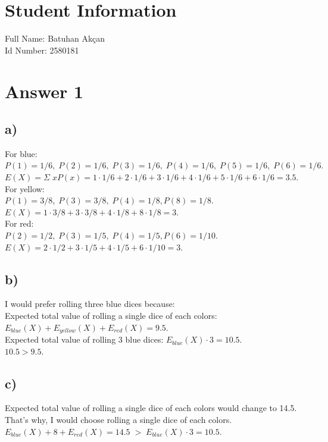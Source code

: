 \documentclass[12pt]{article}
\begin{document}
\section*{Student Information}
Full Name: Batuhan Akçan\\
Id Number: 2580181
\section*{Answer 1}
\subsection*{a)}
For blue:\\
$P(1) = 1/6, \; P(2) = 1/6, \; P(3)=1/6, \; P(4)=1/6, \; P(5)=1/6, \; P(6)=1/6.$\vspace{0.1cm}\\
$E(X) = \Sigma \; x P(x) = 1\cdot 1/6 + 2 \cdot 1/6 + 3 \cdot 1/6 + 4 \cdot 1/6 + 5 \cdot 1/6 + 6\cdot 1/6 = 3.5.$\vspace{0.1cm}\\
For yellow:\\
$P(1) = 3/8, \; P(3)=3/8, \; P(4)=1/8, P(8)=1/8.$\vspace{0.1cm}\\
$ E(X) = 1\cdot 3/8 + 3\cdot 3/8 + 4\cdot 1/8 + 8\cdot 1/8  = 3.$\vspace{0.1cm}\\
For red:\\
$P(2) = 1/2, \; P(3)=1/5, \; P(4)=1/5, P(6)=1/10.$\vspace{0.1cm}\\
$ E(X) = 2\cdot 1/2 + 3\cdot 1/5 + 4\cdot 1/5 + 6\cdot 1/10  = 3.$
\subsection*{b)}
I would prefer rolling three blue dices because:\vspace{0.1cm}\\
Expected total value of rolling a single dice of each colors:  $E_{blue}(X) + E_{yellow}(X) + E_{red}(X) = 9.5.$\\
Expected total value of rolling 3 blue dices: $E_{blue}(X) \cdot 3 = 10.5.$\\
$10.5 > 9.5.$
\subsection*{c)}
Expected total value of rolling a single dice of each colors would change to 14.5. That's why, I would choose rolling a single dice of each colors.\vspace{0.1cm}\\
$E_{blue}(X) + 8 + E_{red}(X) = 14.5 \; > \; E_{blue}(X) \cdot 3 = 10.5.$
\end{document}

